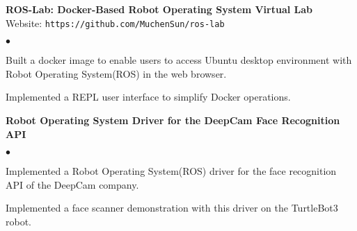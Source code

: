 \documentclass[margin,line,pifont,palatino,courier]{res}
\newenvironment{list2}{
	\begin{list}{$\bullet$}{%
			\setlength{\itemsep}{0in}
			\setlength{\parsep}{0in} \setlength{\parskip}{0in}
			\setlength{\topsep}{0in} \setlength{\partopsep}{0in}
			\setlength{\leftmargin}{0.2in}}}{\end{list}}
\begin{document}
\begin{resume}
		{\bf ROS-Lab: Docker-Based Robot Operating System Virtual Lab} \\
		Website: \verb+https://github.com/MuchenSun/ros-lab+ 
		\begin{list2}
			\item Built a docker image to enable users to access Ubuntu desktop environment with Robot Operating System(ROS) in the web browser.
			\item Implemented a REPL user interface to simplify Docker operations.
		\end{list2}
		
		{\bf Robot Operating System Driver for the DeepCam Face Recognition API} 
		\begin{list2}
			\item Implemented a Robot Operating System(ROS) driver for the face recognition API of the DeepCam company. %
			\item Implemented a face scanner demonstration with this driver on the TurtleBot3 robot.
		\end{list2}
	
		
		

\end{resume}
\end{document}

